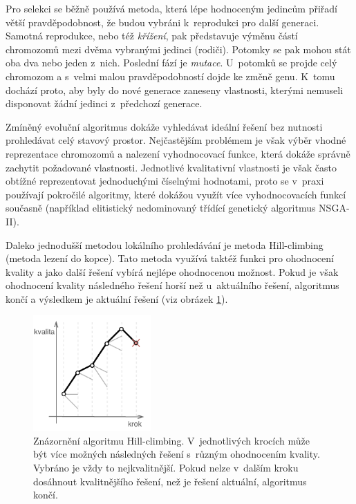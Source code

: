 Pro selekci se běžně používá metoda, která lépe hodnoceným jedincům přiřadí větší pravděpodobnost, že budou vybráni k~reprodukci pro další generaci.
Samotná reprodukce, nebo též \textit{křížení}, pak představuje výměnu částí chromozomů mezi dvěma vybranými jedinci (rodiči).
Potomky se pak mohou stát oba dva nebo jeden z~nich.
Poslední fází je \textit{mutace}.
U~potomků se projde celý chromozom a s~velmi malou pravděpodobností dojde ke změně genu.
K~tomu dochází proto, aby byly do nové generace zaneseny vlastnosti, kterými nemuseli disponovat žádní jedinci z~předchozí generace\cite{lit:pcg_search_based_methods}.
\par
Zmíněný evoluční algoritmus dokáže vyhledávat ideální řešení bez nutnosti prohledávat celý stavový prostor.
Nejčastějším problémem je však výběr vhodné reprezentace chromozomů a nalezení vyhodnocovací funkce, která dokáže správně zachytit požadované vlastnosti.
Jednotlivé kvalitativní vlastnosti je však často obtížné reprezentovat jednoduchými číselnými hodnotami, proto se v~praxi používají pokročilé algoritmy, které dokážou využít více vyhodnocovacích funkcí současně (například elitistický nedominovaný třídící genetický algoritmus NSGA-II).
\par
Daleko jednodušší metodou lokálního prohledávání je metoda Hill-climbing (metoda lezení do kopce).
Tato metoda využívá taktéž funkci pro ohodnocení kvality a jako další řešení vybírá nejlépe ohodnocenou možnost.
Pokud je však ohodnocení kvality následného řešení horší než u~aktuálního řešení, algoritmus končí a výsledkem je aktuální řešení (viz obrázek \ref{img:hill_climbing1}).
\begin{figure}[hbt]
    \centering
    \includegraphics[width=0.4\textwidth]{obrazky/hill_climbing1.pdf}
    \caption{Znázornění algoritmu Hill-climbing. V~jednotlivých krocích může být více možných následných řešení s~různým ohodnocením kvality. Vybráno je vždy to nejkvalitnější. Pokud nelze v~dalším kroku dosáhnout kvalitnějšího řešení, než je řešení aktuální, algoritmus končí.}
    \label{img:hill_climbing1}
\end{figure}
